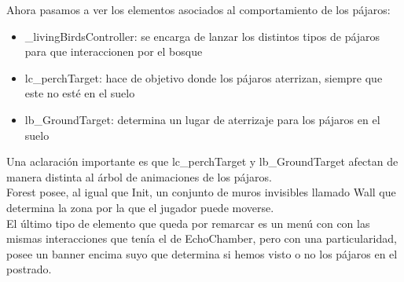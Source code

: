 \quad Ahora pasamos a ver los elementos asociados al comportamiento de los pájaros:

\begin{itemize}
	\item \_livingBirdsController: se encarga de lanzar los distintos tipos de pájaros para que interaccionen por el bosque
	\item lc\_perchTarget: hace de objetivo donde los pájaros aterrizan, siempre que este no esté en el suelo
	\item lb\_GroundTarget: determina un lugar de aterrizaje para los pájaros en el suelo
\end{itemize}

\quad Una aclaración importante es que lc\_perchTarget y lb\_GroundTarget afectan de manera distinta al árbol de animaciones de los pájaros.\\

\quad Forest posee, al igual que Init, un conjunto de muros invisibles llamado Wall que determina la zona por la que el jugador puede moverse.\\ 

\quad El último tipo de elemento que queda por remarcar es un menú con con las mismas interacciones que tenía el de EchoChamber, pero con una particularidad, posee un banner encima suyo que determina si hemos visto o no los pájaros en el postrado.\\


\newpage





